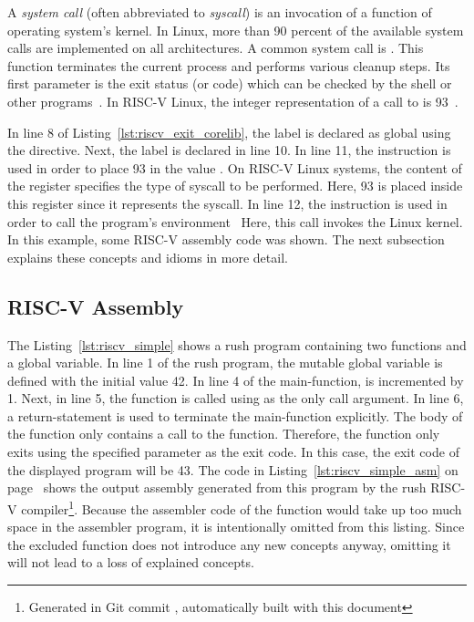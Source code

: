 
A \emph{system call} (often abbreviated to \emph{syscall}) is an invocation of a function of operating system's kernel.
In Linux, more than 90 percent of the available system calls are implemented on all architectures.
A common system call is .
This function terminates the current process and performs various cleanup steps.
Its first parameter is the exit status (or code) which can be checked by the shell or other programs~\cite[p.~148]{Love2013}.
In RISC-V Linux, the integer representation of a call to  is 93~\cite{Torvalds1991}.

In line 8 of Listing~\ref{lst:riscv_exit_corelib}, the  label is declared as global using the  directive.
Next, the  label is declared in line 10.
In line 11, the  instruction is used in order to place 93 in the value .
On RISC-V Linux systems, the content of the  register specifies the type of syscall to be performed.
Here, 93 is placed inside this register since it represents the  syscall.
In line 12, the  instruction is used in order to call the program's environment~\cite[p.~23]{Patterson2017}
Here, this call invokes the Linux kernel.
In this example, some RISC-V assembly code was shown.
The next subsection explains these concepts and idioms in more detail.

\subsection{RISC-V Assembly}

The Listing~\ref{lst:riscv_simple} shows a rush program containing two functions and a global variable.
In line 1 of the rush program, the mutable global variable  is defined with the initial value 42.
In line 4 of the main-function,  is incremented by 1.
Next, in line 5, the  function is called using  as the only call argument.
In line 6, a return-statement is used to terminate the main-function explicitly.
The body of the  function only contains a call to the  function.
Therefore, the  function only exits using the specified parameter  as the exit code.
In this case, the exit code of the displayed program will be 43.
The code in Listing~\ref{lst:riscv_simple_asm} on page~\pageref{lst:riscv_simple_asm} shows the output assembly generated from this program by the rush RISC-V compiler\footnote{Generated in Git commit \rushCommit, automatically built with this document}.
Because the assembler code of the  function would take up too much space in the assembler program, it is intentionally omitted from this listing.
Since the excluded function does not introduce any new concepts anyway, omitting it will not lead to a loss of explained concepts.

